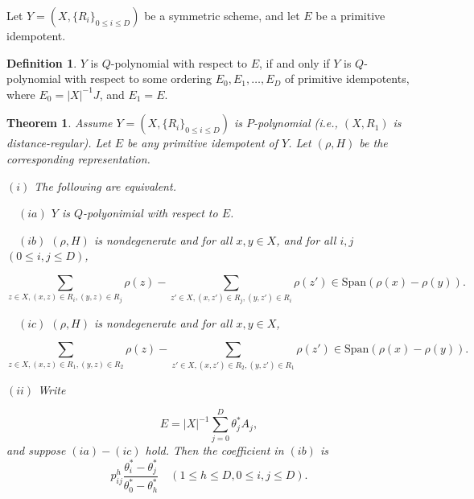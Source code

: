 \documentclass[
]{book}
\newtheorem{theorem}{Theorem}[chapter]
\theoremstyle{definition}
\newtheorem{definition}{Definition}[chapter]
\theoremstyle{definition}
\theoremstyle{definition}
\theoremstyle{definition}
\theoremstyle{remark}
\begin{document}
Let \(Y = (X, \{R_i\}_{0\leq i\leq D})\) be a symmetric scheme, and let \(E\) be a primitive idempotent.

\begin{definition}
\protect\hypertarget{def:q-poly-representation}{}\label{def:q-poly-representation}\(Y\) is \(Q\)-polynomial with respect to \(E\), if and only if \(Y\) is \(Q\)-polynomial with respect to some ordering \(E_0, E_1, \ldots, E_D\) of primitive idempotents, where \(E_0 = |X|^{-1}J\), and \(E_1 = E\).
\end{definition}

\begin{theorem}
\protect\hypertarget{thm:balanced}{}\label{thm:balanced}Assume \(Y = (X, \{R_i\}_{0\leq i\leq D})\) is \(P\)-polynomial (i.e., \((X, R_1)\) is distance-regular). Let \(E\) be any primitive idempotent of \(Y\). Let \((\rho, H)\) be the corresponding representation.

\((i)\) The following are equivalent.

\(\quad (ia)\) \(Y\) is \(Q\)-polyonimial with respect to \(E\).

\(\quad (ib)\) \((\rho, H)\) is nondegenerate and for all \(x,y\in X\), and for all \(i,j\) \((0\leq i,j\leq D)\),

\[\sum_{z\in X, (x,z)\in R_i, (y,z)\in R_j}\rho(z) - \sum_{z'\in X, (x,z')\in R_j, (y,z')\in R_i}\rho(z')\in \mathrm{Span}(\rho(x)-\rho(y)).\]

\(\quad (ic)\) \((\rho, H)\) is nondegenerate and for all \(x,y\in X\),

\[\sum_{z\in X, (x,z)\in R_1, (y,z)\in R_2}\rho(z) - \sum_{z'\in X, (x,z')\in R_2, (y,z')\in R_1}\rho(z')\in \mathrm{Span}(\rho(x)-\rho(y)).\]

\((ii)\) Write

\[E = |X|^{-1}\sum_{j=0}^D \theta^*_j A_j,\]
and suppose \((ia)-(ic)\) hold. Then the coefficient in \((ib)\) is
\[p^h_{ij}\frac{\theta_i^*-\theta_j^*}{\theta^*_0-\theta^*_h} \quad (1\leq h\leq D, 0\leq i,j\leq D).\]
\end{theorem}
\end{document}
